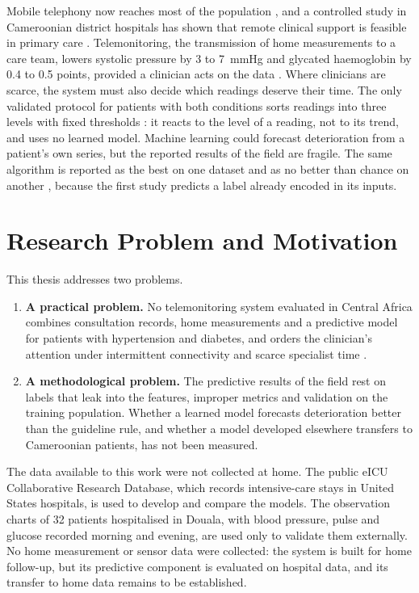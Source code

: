 Mobile telephony now reaches most of the population \parencite{segun2025}, and a controlled study in Cameroonian district hospitals has shown that remote clinical support is feasible in primary care \parencite{bediang2021}. Telemonitoring, the transmission of home measurements to a care team, lowers systolic pressure by 3 to 7~mmHg and glycated haemoglobin by 0.4 to 0.5 points, provided a clinician acts on the data \parencite{mao2020,mihevc2025}. Where clinicians are scarce, the system must also decide which readings deserve their time. The only validated protocol for patients with both conditions sorts readings into three levels with fixed thresholds \parencite{mihevc2025}: it reacts to the level of a reading, not to its trend, and uses no learned model. Machine learning could forecast deterioration from a patient's own series, but the reported results of the field are fragile. The same algorithm is reported as the best on one dataset \parencite{efendi2025} and as no better than chance on another \parencite{mendoza2025}, because the first study predicts a label already encoded in its inputs.

\section*{Research Problem and Motivation}

This thesis addresses two problems.
\begin{enumerate}
  \item \textbf{A practical problem.} No telemonitoring system evaluated in Central Africa combines consultation records, home measurements and a predictive model for patients with hypertension and diabetes, and orders the clinician's attention under intermittent connectivity and scarce specialist time \parencite{dodoo2022,agbeyangi2025}.
  \item \textbf{A methodological problem.} The predictive results of the field rest on labels that leak into the features, improper metrics and validation on the training population. Whether a learned model forecasts deterioration better than the guideline rule, and whether a model developed elsewhere transfers to Cameroonian patients, has not been measured.
\end{enumerate}

The data available to this work were not collected at home. The public eICU Collaborative Research Database, which records intensive-care stays in United States hospitals, is used to develop and compare the models. The observation charts of 32 patients hospitalised in Douala, with blood pressure, pulse and glucose recorded morning and evening, are used only to validate them externally. No home measurement or sensor data were collected: the system is built for home follow-up, but its predictive component is evaluated on hospital data, and its transfer to home data remains to be established.

